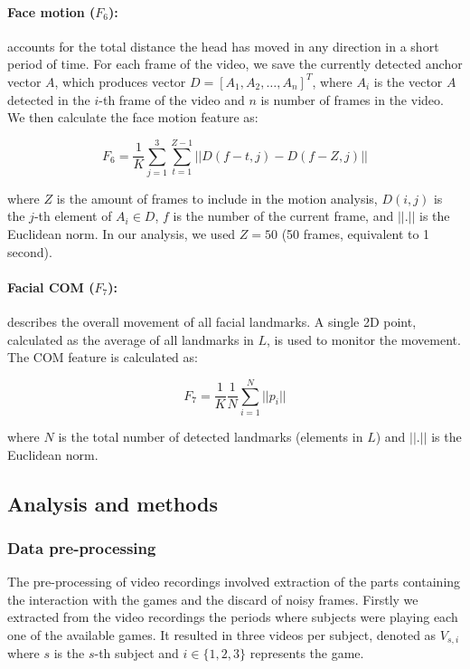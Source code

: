 \paragraph{Face motion ($F_6$):} accounts for the total distance the head has moved in any direction in a short period of time. For each frame of the video, we save the currently detected anchor vector $A$, which produces vector $D = [A_1, A_2, \dots, A_n]^T$, where $A_i$ is the vector $A$ detected in the $i$-th frame of the video and $n$ is number of frames in the video. We then calculate the face motion feature as:

\[
F_6 = \frac{1}{K} \sum_{j=1}^{3} \sum_{t=1}^{Z - 1} || D(f - t, j) - D(f - Z, j) ||
\]

where $Z$ is the amount of frames to include in the motion analysis, $D(i,j)$ is the $j$-th element of $A_i \in D$, $f$ is the number of the current frame, and $||.||$ is the Euclidean norm. In our analysis, we used $Z=50$ (50 frames, equivalent to 1 second).

\paragraph{Facial COM ($F_7$):} describes the overall movement of all facial landmarks. A single 2D point, calculated as the average of all landmarks in $L$, is used to monitor the movement. The COM feature is calculated as:

\[
F_7 = \frac{1}{K} \frac{1}{N} \sum_{i=1}^{N} || p_i ||
\]

where $N$ is the total number of detected landmarks (elements in $L$) and $||.||$ is the Euclidean norm.

\subsection{Analysis and methods}
\label{s:experiment1-study4-feature-analysis}

\subsubsection{Data pre-processing}

The pre-processing of video recordings involved extraction of the parts containing the interaction with the games and the discard of noisy frames. Firstly we extracted from the video recordings the periods where subjects were playing each one of the available games. It resulted in three videos per subject, denoted as $V_{s,i}$ where $s$ is the $s$-th subject and $i \in \{1, 2, 3\}$ represents the game.

